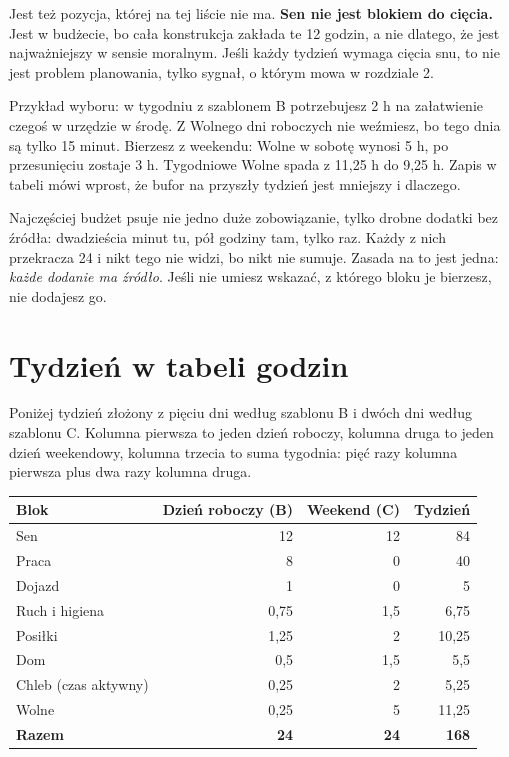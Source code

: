 Jest też pozycja, której na tej liście nie ma. \textbf{Sen nie jest blokiem do cięcia.} Jest w budżecie, bo cała konstrukcja zakłada te 12 godzin, a nie dlatego, że jest najważniejszy w sensie moralnym. Jeśli każdy tydzień wymaga cięcia snu, to nie jest problem planowania, tylko sygnał, o którym mowa w rozdziale 2.

Przykład wyboru: w tygodniu z szablonem B potrzebujesz 2 h na załatwienie czegoś w urzędzie w środę. Z Wolnego dni roboczych nie weźmiesz, bo tego dnia są tylko 15 minut. Bierzesz z weekendu: Wolne w sobotę wynosi 5 h, po przesunięciu zostaje 3 h. Tygodniowe Wolne spada z 11,25 h do 9,25 h. Zapis w tabeli mówi wprost, że bufor na przyszły tydzień jest mniejszy i dlaczego.

\begin{falle}
Najczęściej budżet psuje nie jedno duże zobowiązanie, tylko drobne dodatki bez źródła: dwadzieścia minut tu, pół godziny tam, \glqq tylko raz\grqq{}. Każdy z nich przekracza 24 i nikt tego nie widzi, bo nikt nie sumuje. Zasada na to jest jedna: \emph{każde dodanie ma źródło}. Jeśli nie umiesz wskazać, z którego bloku je bierzesz, nie dodajesz go.
\end{falle}

\section{Tydzień w tabeli godzin}

Poniżej tydzień złożony z pięciu dni według szablonu B i dwóch dni według szablonu C. Kolumna pierwsza to jeden dzień roboczy, kolumna druga to jeden dzień weekendowy, kolumna trzecia to suma tygodnia: pięć razy kolumna pierwsza plus dwa razy kolumna druga.

\begin{center}
\begin{tabular}{@{}lrrr@{}}
\toprule
\textbf{Blok} & \textbf{Dzień roboczy (B)} & \textbf{Weekend (C)} & \textbf{Tydzień} \\
\midrule
Sen & 12 & 12 & 84 \\
Praca & 8 & 0 & 40 \\
Dojazd & 1 & 0 & 5 \\
Ruch i higiena & 0,75 & 1,5 & 6,75 \\
Posiłki & 1,25 & 2 & 10,25 \\
Dom & 0,5 & 1,5 & 5,5 \\
Chleb (czas aktywny) & 0,25 & 2 & 5,25 \\
Wolne & 0,25 & 5 & 11,25 \\
\midrule
\textbf{Razem} & \textbf{24} & \textbf{24} & \textbf{168} \\
\bottomrule
\end{tabular}
\end{center}

